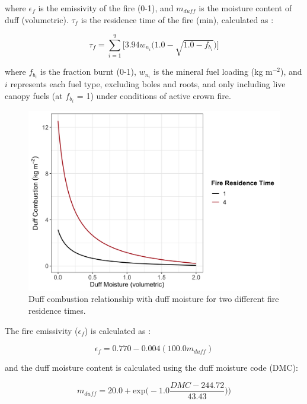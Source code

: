 \documentclass[a4paper, 12pt] {report}
\begin{document}
where $\epsilon_f$ is the emissivity of the fire (0-1), and $m_{duff}$ is the moisture content of duff (volumetric). $\tau_f$ is the residence time of the fire (min), calculated as \cite{petersonModelingPostfireConifer1986}:

\begin{equation} \label{eq:residence}
	\tau_f =  \sum_{i=1}^{9} \Big[3.94w_{n_i}\Big(1.0 - \sqrt{1.0 - f_{b_i}}\Big)\Big]
\end{equation}

where $f_{b_i}$ is the fraction burnt (0-1), $w_{n_i}$ is the mineral fuel loading (kg m$^{-2}$), and $i$ represents each fuel type, excluding boles and roots, and only including live canopy fuels (at $f_{b_i}$ = 1) under conditions of active crown fire.

\begin{figure} 
	\includegraphics[width=\linewidth]{figures/DuffCombust.png}
	\caption{Duff combustion relationship with duff moisture for two different fire residence times.}
	\label{fig:duffcombust}
\end{figure}

The fire emissivity ($\epsilon_f$) is calculated as \cite{vanwagnerDuffConsumptionFire1972}:

\begin{equation}
	\epsilon_f = 0.770 - 0.004(100.0m_{duff})
\end{equation}

and the duff moisture content is calculated using the duff moisture code (DMC):

\begin{equation}
	m_{duff} =20.0 + \text{exp}\Big(-1.0\frac{DMC - 244.72}{43.43})\Big) 
\end{equation}
\end{document}
